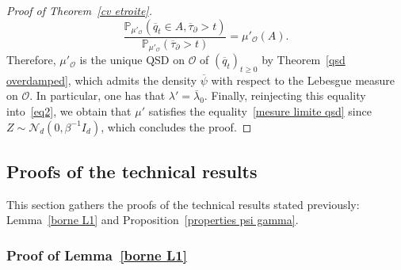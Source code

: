 \documentclass[preprint,EJP]{ejpecp}
\begin{document}
\begin{proof}[Proof of Theorem~\ref{cv etroite}]
$$\frac{\mathbb{P}_{\mu'_\mathcal{O}}(\overline{q}_t\in A, \overline{\tau}_\partial>t)}{\mathbb{P}_{\mu'_\mathcal{O}}(\overline{\tau}_\partial>t)}=\mu'_\mathcal{O}(A).$$ Therefore, $\mu'_\mathcal{O}$ is the unique QSD on $\mathcal{O}$ of $(\overline{q}_t)_{t\geq0}$ by Theorem~\ref{qsd overdamped}, which admits the density $\overline{\psi}$ with respect to the Lebesgue measure on $\mathcal{O}$. In particular, one has that $\lambda'=\overline{\lambda}_0$. Finally, reinjecting this equality into~\eqref{eq2}, we obtain that $\mu'$ satisfies the equality~\eqref{mesure limite qsd} since $Z\sim \mathcal{N}_d(0,\beta^{-1} I_d)$, which concludes the proof. 
\end{proof}
\subsection{Proofs of the technical results}\label{Proofs}
This section gathers the proofs of the technical results stated previously: Lemma~\ref{borne L1} and Proposition~\ref{properties psi gamma}.
\subsubsection{Proof of Lemma~\ref{borne L1}}
 
\end{document}
